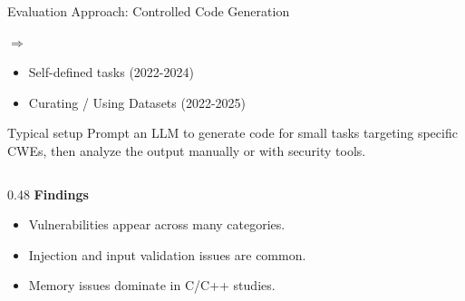 \begin{frame}{Evaluation Approach: Controlled Code Generation}

    $\Rightarrow$ \textbf{}
    \vspace{0.1cm}
    \begin{itemize}
        \item Self-defined tasks (2022-2024) {\small\cite{task_pearce_2022, task_khoury_2023, task_jamdade_2024, task_liu_2024, task_majdinasab_2024}} 
        \item Curating / Using Datasets (2022-2025) {\small\cite{dataset_siddiq_2022, dataset_asare_2023, dataset_hajipour_2024, dataset_siddiq_2024, dataset_tihanyi_2024, dataset_toth_2024, dataset_aydın_2025, dataset_gong_2025}}
    \end{itemize}

    
    \begin{block}{Typical setup}
    Prompt an LLM to generate code for small tasks targeting specific CWEs, then analyze the output manually or with security tools.
    \end{block}
    
    \medskip
    
    \begin{columns}[T]
    \begin{column}{0.48\textwidth}
    \textbf{Findings}
    \begin{itemize}
        \item Vulnerabilities appear across many categories.
        \item Injection and input validation issues are common.
        \item Memory issues dominate in C/C++ studies.
    \end{itemize}
    \end{column}
    

\end{columns}
\end{frame}

